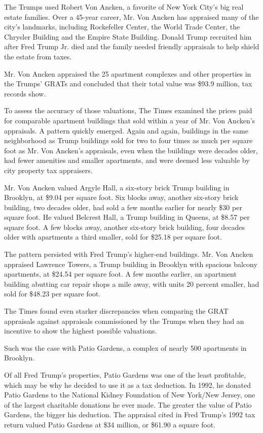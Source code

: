 The Trumps used Robert Von Ancken, a favorite of New York City's big
real estate families. Over a 45-year career, Mr. Von Ancken has
appraised many of the city's landmarks, including Rockefeller Center,
the World Trade Center, the Chrysler Building and the Empire State
Building. Donald Trump recruited him after Fred Trump Jr. died and the
family needed friendly appraisals to help shield the estate from taxes.

Mr. Von Ancken appraised the 25 apartment complexes and other properties
in the Trumps' GRATs and concluded that their total value was \$93.9
million, tax records show.

To assess the accuracy of those valuations, The Times examined the
prices paid for comparable apartment buildings that sold within a year
of Mr. Von Ancken's appraisals. A pattern quickly emerged. Again and
again, buildings in the same neighborhood as Trump buildings sold for
two to four times as much per square foot as Mr. Von Ancken's
appraisals, even when the buildings were decades older, had fewer
amenities and smaller apartments, and were deemed less valuable by city
property tax appraisers.

Mr. Von Ancken valued Argyle Hall, a six-story brick Trump building in
Brooklyn, at \$9.04 per square foot. Six blocks away, another six-story
brick building, two decades older, had sold a few months earlier for
nearly \$30 per square foot. He valued Belcrest Hall, a Trump building
in Queens, at \$8.57 per square foot. A few blocks away, another
six-story brick building, four decades older with apartments a third
smaller, sold for \$25.18 per square foot.

The pattern persisted with Fred Trump's higher-end buildings. Mr. Von
Ancken appraised Lawrence Towers, a Trump building in Brooklyn with
spacious balcony apartments, at \$24.54 per square foot. A few months
earlier, an apartment building abutting car repair shops a mile away,
with units 20 percent smaller, had sold for \$48.23 per square foot.

The Times found even starker discrepancies when comparing the GRAT
appraisals against appraisals commissioned by the Trumps when they had
an incentive to show the highest possible valuations.

Such was the case with Patio Gardens, a complex of nearly 500 apartments
in Brooklyn.

Of all Fred Trump's properties, Patio Gardens was one of the least
profitable, which may be why he decided to use it as a tax deduction. In
1992, he donated Patio Gardens to the National Kidney Foundation of New
York/New Jersey, one of the largest charitable donations he ever made.
The greater the value of Patio Gardens, the bigger his deduction. The
appraisal cited in Fred Trump's 1992 tax return valued Patio Gardens at
\$34 million, or \$61.90 a square foot.

